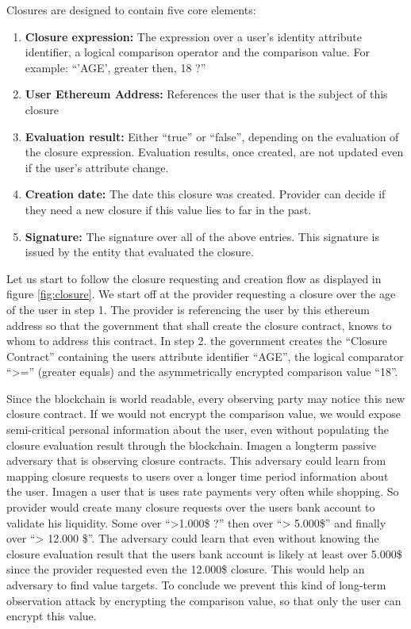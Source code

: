\noindent Closures are designed to contain five core elements:
\begin{enumerate}
\item \textbf{Closure expression:} The expression over a user’s identity attribute identifier, a logical  comparison operator and the comparison value. For example: “’AGE’, greater then, 18 ?”
\item \textbf{User Ethereum Address:} References the user that is the subject of this closure
\item \textbf{Evaluation result:} Either “true” or “false”, depending on the evaluation of the closure expression. Evaluation results, once created, are not updated even if the user’s attribute change.
\item \textbf{Creation date:} The date this closure was created. Provider can decide if they need a new closure if this value lies to far in the past. 
\item \textbf{Signature:} The signature over all of the above entries. This signature is issued by the entity that evaluated the closure.
\end{enumerate}

Let us start to follow the closure requesting and creation flow as displayed in figure \ref{fig:closure}. We start off at the provider requesting a closure over the age of the user in step 1. 
The provider is referencing the user by this ethereum address so that the government that shall create the closure contract, knows to whom to address this contract. In step 2. the government creates the “Closure Contract” containing the users attribute identifier “AGE”, the logical comparator “>=” (greater equals) and the asymmetrically encrypted comparison value “18”.  

Since the blockchain is world readable, every observing party may notice this new closure contract. If we would not encrypt the comparison value, we would expose semi-critical personal information about the user, even without populating the closure evaluation result through the blockchain. Imagen a longterm passive adversary that is observing closure contracts. This adversary could learn from mapping closure requests to users over a longer time period information about the user. Imagen a user that is uses rate payments very often while shopping. So provider would create many closure requests over the users bank account to validate his liquidity. Some over “>1.000\$ ?” then over “> 5.000\$” and finally over “> 12.000 \$”. The adversary could learn that even without knowing the closure evaluation result that the users bank account is likely at least over 5.000\$ since the provider requested even the 12.000\$ closure. This would help an adversary to find value targets. 
To conclude we prevent this kind of long-term observation attack by encrypting the comparison value, so that only the user can encrypt this value. 

